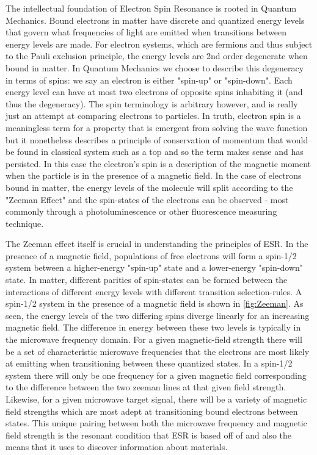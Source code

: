 \documentclass[oneside, astronomy, noacknowlegments]{BYUPhys}
\begin{document}
The intellectual foundation of Electron Spin Resonance is rooted in Quantum Mechanics. Bound electrons in matter have discrete and quantized energy levels that govern what frequencies of light are emitted when transitions between energy levels are made. For electron systems, which are fermions and thus subject to the Pauli exclusion principle, the energy levels are 2nd order degenerate when bound in matter. In Quantum Mechanics we choose to describe this degeneracy in terms of spins: we say an electron is either "spin-up" or "spin-down". Each energy level can have at most two electrons of opposite spins inhabiting it (and thus the degeneracy). The spin terminology is arbitrary however, and is really just an attempt at comparing electrons to particles. In truth, electron spin is a meaningless term for a property that is emergent from solving the wave function but it nonetheless describes a principle of conservation of momentum that would be found in classical system such as a top and so the term makes sense and has persisted. In this case the electron’s spin is a description of the magnetic moment when the particle is in the presence of a magnetic field. In the case of electrons bound in matter, the energy levels of the molecule will split according to the "Zeeman Effect" and the spin-states of the electrons can be observed - most commonly through a photoluminescence or other fluorescence measuring technique.

The Zeeman effect itself is crucial in understanding the principles of ESR. In the presence of a magnetic field, populations of free electrons will form a spin-1/2 system between a higher-energy "spin-up" state and a lower-energy "spin-down" state. In matter, different parities of spin-states can be formed between the interactions of different energy levels with different transition selection-rules. A spin-1/2 system in the presence of a magnetic field is shown in \ref{fig:Zeeman}. As seen, the energy levels of the two differing spins diverge linearly for an increasing magnetic field. The difference in energy between these two levels is typically in the microwave frequency domain. For a given magnetic-field strength there will be a set of characteristic microwave frequencies that the electrons are most likely at emitting when transitioning between these quantized states. In a spin-1/2 system there will only be one frequency for a given magnetic field corresponding to the difference between the two zeeman lines at that given field strength. Likewise, for a given microwave target signal, there will be a variety of magnetic field strengths which are most adept at transitioning bound electrons between states. This unique pairing between both the microwave frequency and magnetic field strength is the resonant condition that ESR is based off of and also the means that it uses to discover information about materials.
\end{document}
